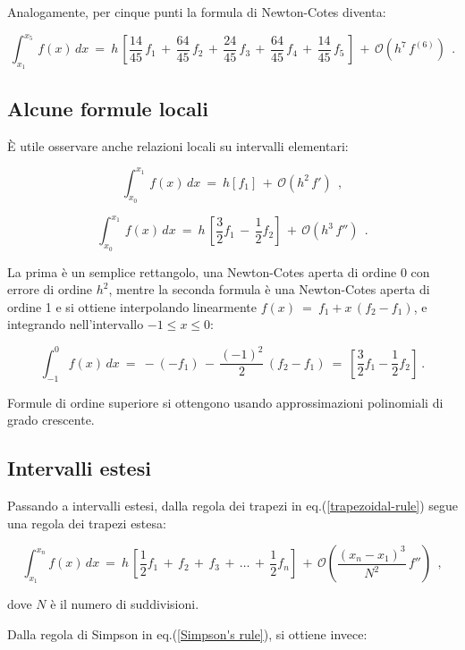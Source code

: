 \documentclass{article}
\begin{document}
	Analogamente, per cinque punti la formula di Newton-Cotes diventa:
	
	\[ \int_{x_1}^{x_5}\, f(x)\, dx\ =\ h\, \left[ \frac{14}{45}\, f_1\, +\, \frac{64}{45}\, f_2\, +\, \frac{24}{45}\, f_3\, +\, \frac{64}{45}\, f_4\, +\, \frac{14}{45}\, f_5\, \right]\, +\, \mathcal{O}(h^7\, f^{(6)})\ \ .\]
	
	\subsection{Alcune formule locali}
	
	È utile osservare anche relazioni locali su intervalli elementari:
	
	\[ \int_{x_0}^{x_1}\, f(x)\, dx\ =\ h[f_1]\, +\, \mathcal{O}(h^2\, f')\ \ ,\]
	
	
	\[ \int_{x_0}^{x_1}\, f(x)\, dx\ =\ h\, \left[ \frac{3}{2}f_1\, -\, \frac{1}{2}f_2 \right]\, +\, \mathcal{O}(h^3\, f'')\ \ .\]
	
	La prima è un semplice rettangolo, una Newton-Cotes aperta di ordine 0 con errore di ordine $h^2$, mentre la seconda formula è una Newton-Cotes aperta di ordine 1 e si ottiene interpolando linearmente $f(x)\ =\ f_1 + x\, (f_2 - f_1)$, e integrando nell'intervallo $-1 \le x \le 0$:
	
	\[ \int_{-1}^{0} f(x)\,dx\ =\ -(-f_1)\, -\, \frac{(-1)^2}{2}\, (f_2 - f_1) \ =\ \left[ \frac{3}{2}f_1 - \frac{1}{2}f_2\right]\ .\]
	
	Formule di ordine superiore si ottengono usando approssimazioni polinomiali di grado crescente.
	
	\subsection{Intervalli estesi}
	
	Passando a intervalli estesi, dalla regola dei trapezi in eq.(\ref{trapezoidal-rule}) segue una regola dei trapezi estesa:
	
	\begin{equation} \label{regola-dei-trapezi-estesa}
		\int_{x_1}^{x_n} f(x)\,dx\ =\ h\, \left[
		\frac{1}{2}f_1\, +\, f_2\, +\, f_3\, +\, \dots\, +\, \frac{1}{2}f_n
		\right]\, +\,
		\mathcal{O}\!\left(\frac{(x_n-x_1)^3}{N^2}\, f''\right)\ \ ,
	\end{equation} 
	
	dove $N$ è il numero di suddivisioni.
	
	Dalla regola di Simpson in eq.(\ref{Simpson's rule}), si ottiene invece:
	
\end{document}
